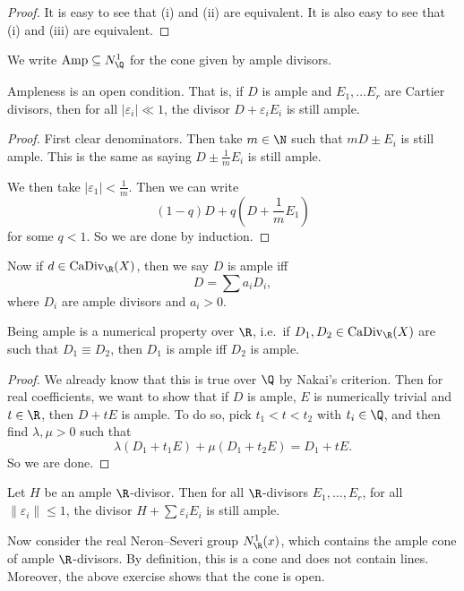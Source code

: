 \documentclass[a4paper]{article}
\newcommand\CaDiv{\mathrm{CaDiv}}
\newcommand\Amp{\mathrm{Amp}}
\begin{document}
\begin{proof}
  It is easy to see that (i) and (ii) are equivalent. It is also easy to see that (i) and (iii) are equivalent.
\end{proof}

We write $\Amp \subseteq N_\Q^1$ for the cone given by ample divisors.

\begin{prop}
  Ampleness is an open condition. That is, if $D$ is ample and $E_1, \ldots E_r$ are Cartier divisors, then for all $|\varepsilon_i| \ll 1$, the divisor $D + \varepsilon_i E_i$ is still ample.
\end{prop}

\begin{proof}
  First clear denominators. Then take $m \in \N$ such that $mD \pm E_i$ is still ample. This is the same as saying $D \pm \frac{1}{m} E_i$ is still ample.

  We then take $|\varepsilon_1| < \frac{1}{m}$. Then we can write
  \[
    (1 - q) D + q \left(D + \frac{1}{m} E_1\right)
  \]
  for some $q < 1$. So we are done by induction.
\end{proof}

Now if $d \in \CaDiv_\R(X)$, then we say $D$ is ample iff
\[
  D = \sum a_i D_i,
\]
where $D_i$ are ample divisors and $a_i > 0$.

\begin{prop}
  Being ample is a numerical property over $\R$, i.e.\ if $D_1, D_2 \in \CaDiv_\R(X)$ are such that $D_1 \equiv D_2$, then $D_1$ is ample iff $D_2$ is ample.
\end{prop}

\begin{proof}
  We already know that this is true over $\Q$ by Nakai's criterion. Then for real coefficients, we want to show that if $D$ is ample, $E$ is numerically trivial and $t \in \R$, then $D + tE$ is ample. To do so, pick $t_1 < t < t_2$ with $t_i \in \Q$, and then find $\lambda, \mu > 0$ such that
  \[
    \lambda (D_1 + t_1 E) + \mu (D_1 + t_2 E) = D_1 + t E.
  \]
  So we are done.
\end{proof}

\begin{ex}
  Let $H$ be an ample $\R$-divisor. Then for all $\R$-divisors $E_1, \ldots, E_r$, for all $\|\varepsilon_i\| \leq 1$, the divisor $H + \sum \varepsilon_i E_i$ is still ample.
\end{ex}

Now consider the real Neron--Severi group $N^1_\R(x)$, which contains the ample cone of ample $\R$-divisors. By definition, this is a cone and does not contain lines. Moreover, the above exercise shows that the cone is open.
\end{document}
